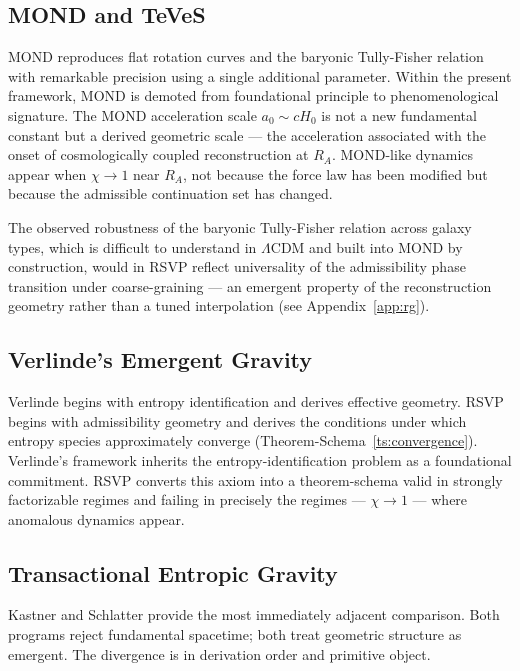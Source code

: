 \documentclass[11pt, a4paper]{article}
\theoremstyle{plain}
\theoremstyle{definition}
\theoremstyle{remark}
\newcommand{\RA}{R_{\!A}}
\begin{document}
\subsection{MOND and TeVeS}

MOND \cite{milgrom1983} reproduces flat rotation curves and the baryonic
Tully-Fisher relation \cite{mcgaugh2011} with remarkable precision using a single
additional parameter. Within the present framework, MOND is demoted from foundational
principle to phenomenological signature. The MOND acceleration scale $a_0 \sim cH_0$
is not a new fundamental constant but a derived geometric scale --- the acceleration
associated with the onset of cosmologically coupled reconstruction at $\RA$.
MOND-like dynamics appear when $\chi \to 1$ near $\RA$, not because the force law
has been modified but because the admissible continuation set has changed.

The observed robustness of the baryonic Tully-Fisher relation \cite{mcgaugh2011}
across galaxy types, which is difficult to understand in $\Lambda$CDM and built into
MOND by construction, would in RSVP reflect universality of the admissibility phase
transition under coarse-graining --- an emergent property of the reconstruction
geometry rather than a tuned interpolation (see Appendix~\ref{app:rg}).

\subsection{Verlinde's Emergent Gravity}

Verlinde \cite{verlinde2011,verlinde2017} begins with entropy identification and
derives effective geometry. RSVP begins with admissibility geometry and derives the
conditions under which entropy species approximately converge
(Theorem-Schema~\ref{ts:convergence}). Verlinde's framework inherits the
entropy-identification problem \cite{jaynes1957} as a foundational commitment. RSVP
converts this axiom into a theorem-schema valid in strongly factorizable regimes and
failing in precisely the regimes --- $\chi \to 1$ --- where anomalous dynamics appear.

\subsection{Transactional Entropic Gravity}

Kastner and Schlatter \cite{kastner2024} provide the most immediately adjacent
comparison. Both programs reject fundamental spacetime; both treat geometric structure
as emergent. The divergence is in derivation order and primitive object.
\end{document}
